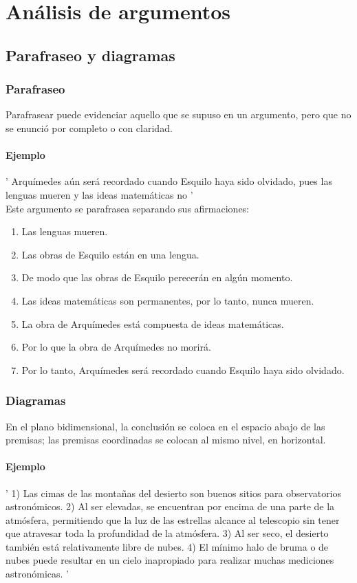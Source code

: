 \documentclass[10pt]{book} 						%
\begin{document}
\section{Análisis de argumentos}
\subsection{Parafraseo y diagramas}
\subsubsection{Parafraseo}
Parafrasear puede evidenciar aquello que se supuso en un argumento, pero que no se enunció por completo o con claridad.
\paragraph{Ejemplo}
' Arquímedes aún será recordado cuando Esquilo haya sido olvidado, pues las lenguas mueren y las ideas matemáticas no '\\
Este argumento se parafrasea separando sus afirmaciones:
\begin{enumerate}
\item Las lenguas mueren.
\item Las obras de Esquilo están en una lengua.
\item De modo que las obras de Esquilo perecerán en algún momento.
\item Las ideas matemáticas son permanentes, por lo tanto, nunca mueren.
\item La obra de Arquímedes está compuesta de ideas matemáticas.
\item Por lo que la obra de Arquímedes no morirá.
\item Por lo tanto, Arquímedes será recordado cuando Esquilo haya sido olvidado.
\end{enumerate}
\subsubsection{Diagramas}
En el plano bidimensional, la conclusión se coloca en el espacio abajo de las premisas; las premisas coordinadas se colocan al mismo nivel, en horizontal.
\paragraph{Ejemplo}
' 1) Las cimas de las montañas del desierto son buenos sitios para observatorios astronómicos. 2) Al ser elevadas, se encuentran por encima de una parte de la atmósfera, permitiendo que la luz de las estrellas alcance al telescopio sin tener que atravesar toda la profundidad de la atmósfera. 3) Al ser seco, el desierto también está relativamente libre de nubes. 4) El mínimo halo de bruma o de nubes puede resultar en un cielo inapropiado para realizar muchas mediciones astronómicas. '
\begin{center}

\end{center}
\end{document}
